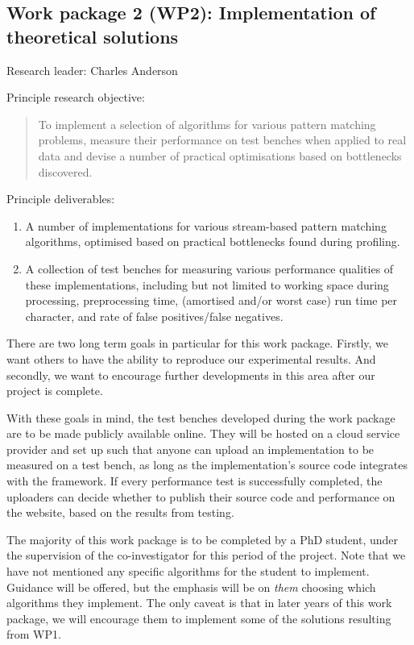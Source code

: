 \documentclass[a4paper,11pt]{article}
\begin{document}
    \subsection*{Work package 2 (WP2): Implementation of theoretical solutions}

    Research leader: Charles Anderson

    Principle research objective:
    \begin{quote}
        To implement a selection of algorithms for various pattern matching problems, measure their performance on test benches when applied to real data and devise a number of practical optimisations based on bottlenecks discovered.
    \end{quote}

    Principle deliverables:
    \begin{enumerate}
        \item A number of implementations for various stream-based pattern matching algorithms, optimised based on practical bottlenecks found during profiling.
        \item A collection of test benches for measuring various performance qualities of these implementations, including but not limited to working space during processing, preprocessing time, (amortised and/or worst case) run time per character, and rate of false positives/false negatives.
    \end{enumerate}

    There are two long term goals in particular for this work package. Firstly, we want others to have the ability to reproduce our experimental results. And secondly, we want to encourage further developments in this area after our project is complete.

    With these goals in mind, the test benches developed during the work package are to be made publicly available online. They will be hosted on a cloud service provider and set up such that anyone can upload an implementation to be measured on a test bench, as long as the implementation's source code integrates with the framework. If every performance test is successfully completed, the uploaders can decide whether to publish their source code and performance on the website, based on the results from testing.

    The majority of this work package is to be completed by a PhD student, under the supervision of the co-investigator for this period of the project. Note that we have not mentioned any specific algorithms for the student to implement. Guidance will be offered, but the emphasis will be on \textit{them} choosing which algorithms they implement. The only caveat is that in later years of this work package, we will encourage them to implement some of the solutions resulting from WP1.
\end{document}
